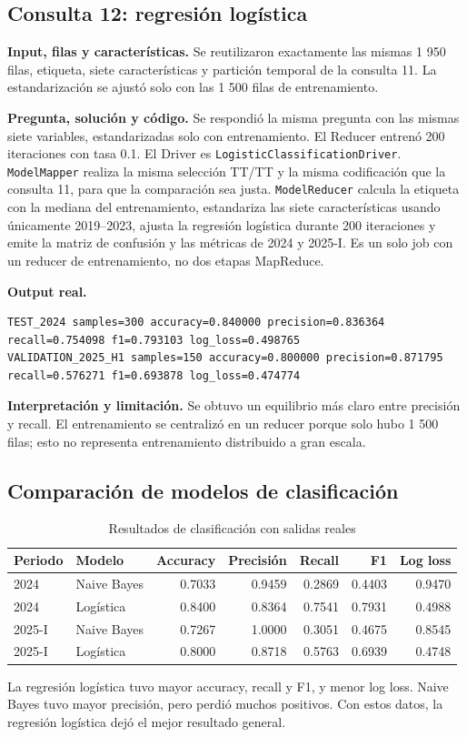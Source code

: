 \documentclass[10pt,a4paper]{article}
\theoremstyle{definition}
\begin{document}
\subsection{Consulta 12: regresión logística}
\textbf{Input, filas y características.} Se reutilizaron exactamente las mismas
1 950 filas, etiqueta, siete características y partición temporal de la consulta
11. La estandarización se ajustó solo con las 1 500 filas de entrenamiento.

\textbf{Pregunta, solución y código.} Se respondió la misma pregunta con las
mismas siete variables, estandarizadas solo con entrenamiento. El Reducer
entrenó 200 iteraciones con tasa 0.1. El Driver es
\texttt{LogisticClassificationDriver}. \texttt{ModelMapper} realiza la misma
selección TT/TT y la misma codificación que la consulta 11, para que la
comparación sea justa. \texttt{ModelReducer} calcula la etiqueta con la mediana
del entrenamiento, estandariza las siete características usando únicamente
2019--2023, ajusta la regresión logística durante 200 iteraciones y emite la
matriz de confusión y las métricas de 2024 y 2025-I. Es un solo job con un
reducer de entrenamiento, no dos etapas MapReduce.

\textbf{Output real.}
\begin{lstlisting}[style=resultado]
TEST_2024 samples=300 accuracy=0.840000 precision=0.836364 recall=0.754098 f1=0.793103 log_loss=0.498765
VALIDATION_2025_H1 samples=150 accuracy=0.800000 precision=0.871795 recall=0.576271 f1=0.693878 log_loss=0.474774
\end{lstlisting}
\textbf{Interpretación y limitación.} Se obtuvo un equilibrio más claro entre
precisión y recall. El entrenamiento se centralizó en un reducer porque solo
hubo 1 500 filas; esto no representa entrenamiento distribuido a gran escala.

\subsection{Comparación de modelos de clasificación}
\begin{table}[H]
\centering\small
\caption{Resultados de clasificación con salidas reales}
\begin{tabular}{llrrrrr}
\toprule
Periodo & Modelo & Accuracy & Precisión & Recall & F1 & Log loss \\
\midrule
2024 & Naive Bayes & 0.7033 & 0.9459 & 0.2869 & 0.4403 & 0.9470 \\
2024 & Logística & 0.8400 & 0.8364 & 0.7541 & 0.7931 & 0.4988 \\
2025-I & Naive Bayes & 0.7267 & 1.0000 & 0.3051 & 0.4675 & 0.8545 \\
2025-I & Logística & 0.8000 & 0.8718 & 0.5763 & 0.6939 & 0.4748 \\
\bottomrule
\end{tabular}
\end{table}
La regresión logística tuvo mayor accuracy, recall y F1, y menor log loss. Naive
Bayes tuvo mayor precisión, pero perdió muchos positivos. Con estos datos, la
regresión logística dejó el mejor resultado general.
\end{document}
